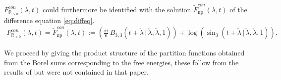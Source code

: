 \documentclass[a4paper,12pt,justification=centering]{article}
\numberwithin{equation}{section}
\newcommand{\I}{{\mathrm i}}
\newcommand{\la}{{\lambda}}
\theoremstyle{plain}%
\theoremstyle{definition}
\begin{document}
$F^{con}_{\mathbb{R}_{>0}}(\la,t)$ could furthermore be identified with the solution $\widetilde{F}^{con}_{\text{np}}(\lambda,t) $ of the difference equation \eqref{eq:diffeq}. 
\begin{equation}
\begin{split}
F^{con}_{\mathbb{R}_{>0}}(\la,t) =\widetilde{F}^{con}_{\text{np}}(\lambda,t) :=  \left(\frac{\pi \I}{6} \, B_{3,3}\left(t+\check\lambda\,|\,\check{\lambda},\check{\lambda},1 \right)\right) + \log\left(\sin_3\left(t+\check{\lambda} \,|\, \check{\lambda},\check{\lambda},1\right)\right).
\end{split}
\end{equation}

We proceed by giving the product structure of the partition functions obtained from the Borel sums corresponding to the free energies, these follow from the results of \cite{Alim:2021mhp} but were not contained in that paper.
\end{document}
